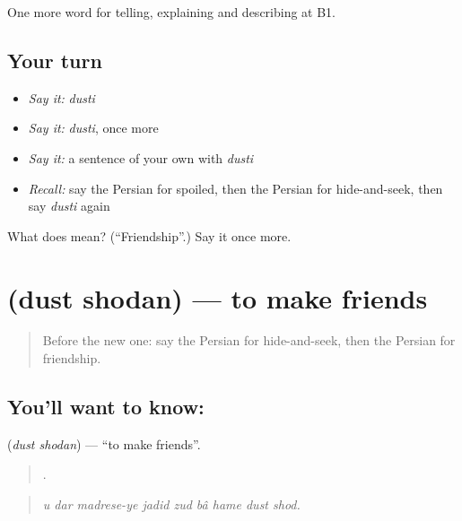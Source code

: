 \begin{grammarlens}[title={What you've built}]
One more word for telling, explaining and describing at B1.
\end{grammarlens}

\subsection*{Your turn}
\begin{itemize}
\raggedright
  \item \emph{Say it:} \emph{dusti}
  \item \emph{Say it:} \emph{dusti}, once more
  \item \emph{Say it:} a sentence of your own with \emph{dusti}
  \item \emph{Recall:} say the Persian for spoiled, then the Persian for hide-and-seek, then say \emph{dusti} again
\end{itemize}

\begin{tcolorbox}[breakable,colback=teal!4,colframe=teal!35!black,title={Before you move on}]
What does  mean? (\textquotedblleft{}Friendship\textquotedblright{}.) Say it once more.
\end{tcolorbox}
\section[\texorpdfstring{\fa{دوست} \fa{شدن} (dust shodan)}{دوست شدن (dust shodan)}]{  (dust shodan) — to make friends}

\label{lesson:FA-C504-dust-shodan}



\begin{quote}
Before the new one: say the Persian for hide-and-seek, then the Persian for friendship.
\end{quote}

\subsection*{You'll want to know:  }
\textbf{ } (\emph{dust shodan}) — \textquotedblleft{}to make friends\textquotedblright{}.

\begin{quote}
        .
\end{quote}

\begin{quote}
\emph{u dar madrese-ye jadid zud bâ hame dust shod.}
\end{quote}

